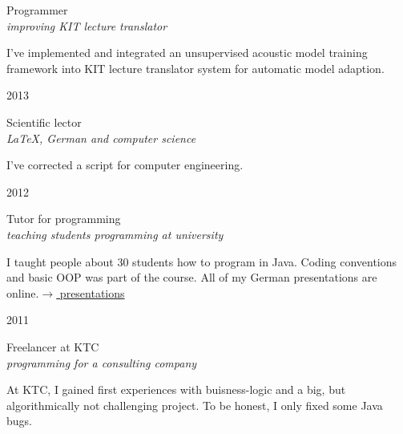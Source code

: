 \documentclass[a4paper,10pt]{article} %
\begin{document}
{\begin{minipage}[t]{0.5\textwidth}
{\raggedright\large Programmer\\
\textit{improving KIT lecture translator}\\[5pt]}

\normalsize{I've implemented and integrated an unsupervised acoustic model training framework into KIT lecture translator system for automatic model adaption.}\\


{\raggedleft\textsc{2013}\par}

{\raggedright\large Scientific lector\\
\textit{\LaTeX{}, German and computer science}\\[5pt]}

\normalsize{I've corrected a script for computer engineering.}\\


{\raggedleft\textsc{2012}\par}

{\raggedright\large Tutor for programming\\
\textit{teaching students programming at university}\\[5pt]}

\normalsize{I taught people about 30 students how to program in Java.
Coding conventions and basic OOP was part of the course. All of my German presentations are online.}\hfill \href{http://martin-thoma.com/programmieren-tutorium/#Folien}{$\rightarrow$ presentations}\\


{\raggedleft\textsc{2011}\par}

{\raggedright\large Freelancer at KTC\\
\textit{programming for a consulting company}\\[5pt]}

\normalsize{At KTC, I gained first experiences with buisness-logic
and a big, but algorithmically not challenging project. To be honest,
I only fixed some Java bugs.}\\


\end{minipage}}
\end{document}
